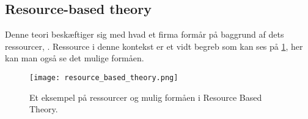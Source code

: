 \subsection{Resource-based theory}\label{resource-based}

Denne teori beskæftiger sig med hvad et firma formår på baggrund af dets ressourcer, \citet[p.~13]{rose2012software}.
Ressource i denne kontekst er et vidt begreb som kan ses på \cref{rbt_fig}, her kan man også se det mulige formåen.

\begin{figure}[H]
  \begin{center}
    \texttt{[image: resource\_based\_theory.png]}
  \end{center}
  \caption{Et eksempel på ressourcer og mulig formåen i Resource Based Theory.}
  \label{rbt_fig}
\end{figure}

